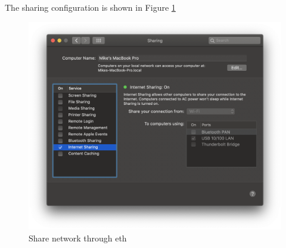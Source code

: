 The sharing configuration is shown in Figure \ref{fig:share-through-eth}
\begin{figure}[!ht]
  \centering
  \includegraphics[width=\textwidth]{pics/share-through-eth}
  \caption{Share network through eth}
  \label{fig:share-through-eth}
\end{figure}



